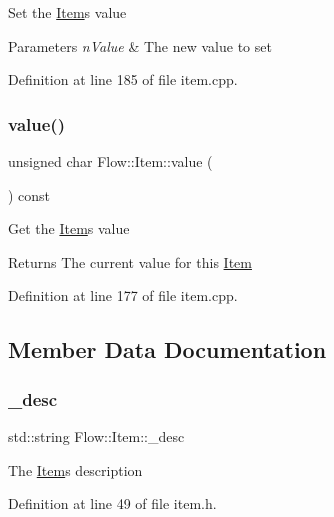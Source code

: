 Set the \hyperlink{class_flow_1_1_item}{Item}\textquotesingle{}s value 
\begin{DoxyParams}{Parameters}
{\em n\+Value} & The new value to set \\
\hline
\end{DoxyParams}


Definition at line 185 of file item.\+cpp.

\hypertarget{class_flow_1_1_item_af475c6f792312b9ad95dae06b6cb29b6}{}\label{class_flow_1_1_item_af475c6f792312b9ad95dae06b6cb29b6} 
\subsubsection{\texorpdfstring{value()}{value()}\hspace{0.1cm}{\footnotesize\ttfamily [2/2]}}
{\footnotesize\ttfamily unsigned char Flow\+::\+Item\+::value (\begin{DoxyParamCaption}{ }\end{DoxyParamCaption}) const}

Get the \hyperlink{class_flow_1_1_item}{Item}\textquotesingle{}s value \begin{DoxyReturn}{Returns}
The current value for this \hyperlink{class_flow_1_1_item}{Item} 
\end{DoxyReturn}


Definition at line 177 of file item.\+cpp.



\subsection{Member Data Documentation}
\hypertarget{class_flow_1_1_item_a43a8e81e91d1ec86e8be9b3172143bda}{}\label{class_flow_1_1_item_a43a8e81e91d1ec86e8be9b3172143bda} 
\subsubsection{\texorpdfstring{\+\_\+desc}{\_desc}}
{\footnotesize\ttfamily std\+::string Flow\+::\+Item\+::\+\_\+desc\hspace{0.3cm}{\ttfamily [protected]}}

The \hyperlink{class_flow_1_1_item}{Item}\textquotesingle{}s description 

Definition at line 49 of file item.\+h.

